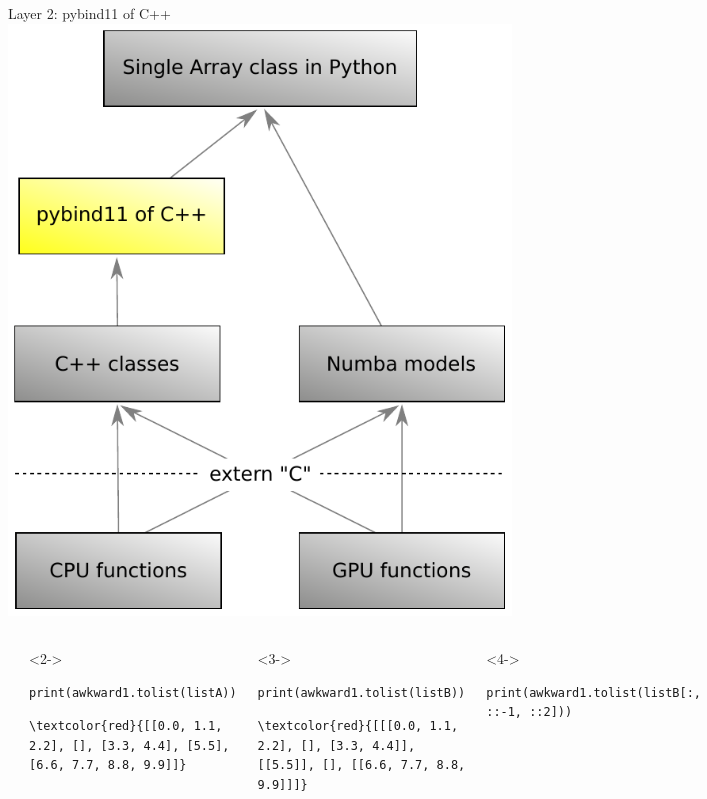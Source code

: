 \documentclass[aspectratio=169]{beamer}
\begin{document}
\begin{frame}[fragile]{Layer 2: pybind11 of C++}
\vspace{0.5 cm}
\hfill\mbox{\includegraphics[height=4 cm]{awkward-1-0-layers-mini-pybind11.pdf}\hspace{-0.75 cm}}

\scriptsize
\vspace{-4.45 cm}
\begin{columns}
\begin{verbatim}
import numpy
import awkward1

content = awkward1.layout.NumpyArray(numpy.arange(10)*1.1)
listA   = awkward1.layout.ListOffsetArray32(
            awkward1.layout.Index32(numpy.array([0, 3, 3, 5, 6, 10])),
            content)
listB   = awkward1.layout.ListOffsetArray32(
            awkward1.layout.Index32(numpy.array([0, 3, 4, 4, 5])),
            listA)
\end{verbatim}
\begin{uncoverenv}<2->
\begin{verbatim}
print(awkward1.tolist(listA))
\end{verbatim}

\vspace{-0.25 cm}
\begin{Verbatim}[commandchars=\\\{\}]
\textcolor{red}{[[0.0, 1.1, 2.2], [], [3.3, 4.4], [5.5], [6.6, 7.7, 8.8, 9.9]]}
\end{Verbatim}
\end{uncoverenv}
\begin{uncoverenv}<3->
\begin{verbatim}
print(awkward1.tolist(listB))
\end{verbatim}

\vspace{-0.25 cm}
\begin{Verbatim}[commandchars=\\\{\}]
\textcolor{red}{[[[0.0, 1.1, 2.2], [], [3.3, 4.4]], [[5.5]], [], [[6.6, 7.7, 8.8, 9.9]]]}
\end{Verbatim}
\end{uncoverenv}
\begin{uncoverenv}<4->
\begin{verbatim}
print(awkward1.tolist(listB[:, ::-1, ::2]))
\end{verbatim}


\end{uncoverenv}
\end{columns}
\end{frame}
\end{document}
